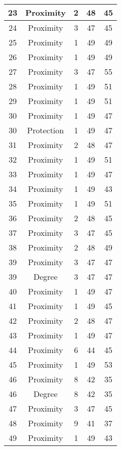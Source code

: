 \documentclass[results.tex]{subfiles}
\begin{document}
\begin{center}
\begin{tabular}{| c || c | c | c | c |}
    \hline
    23 & Proximity & 2 & 48 & 45 \\ 
    \hline
    24 & Proximity & 3 & 47 & 45 \\ 
    \hline
    25 & Proximity & 1 & 49 & 49 \\ 
    \hline
    26 & Proximity & 1 & 49 & 49 \\ 
    \hline
    27 & Proximity & 3 & 47 & 55 \\ 
    \hline
    28 & Proximity & 1 & 49 & 51 \\ 
    \hline
    29 & Proximity & 1 & 49 & 51 \\ 
    \hline
    30 & Proximity & 1 & 49 & 47 \\ 
    \hline
    30 & Protection & 1 & 49 & 47 \\ 
    \hline
    31 & Proximity & 2 & 48 & 47 \\ 
    \hline
    32 & Proximity & 1 & 49 & 51 \\ 
    \hline
    33 & Proximity & 1 & 49 & 47 \\ 
    \hline
    34 & Proximity & 1 & 49 & 43 \\ 
    \hline
    35 & Proximity & 1 & 49 & 51 \\ 
    \hline
    36 & Proximity & 2 & 48 & 45 \\ 
    \hline
    37 & Proximity & 3 & 47 & 45 \\ 
    \hline
    38 & Proximity & 2 & 48 & 49 \\ 
    \hline
    39 & Proximity & 3 & 47 & 47 \\ 
    \hline
    39 & Degree & 3 & 47 & 47 \\ 
    \hline
    40 & Proximity & 1 & 49 & 47 \\ 
    \hline
    41 & Proximity & 1 & 49 & 45 \\ 
    \hline
    42 & Proximity & 2 & 48 & 47 \\ 
    \hline
    43 & Proximity & 1 & 49 & 47 \\ 
    \hline
    44 & Proximity & 6 & 44 & 45 \\ 
    \hline
    45 & Proximity & 1 & 49 & 53 \\ 
    \hline
    46 & Proximity & 8 & 42 & 35 \\ 
    \hline
    46 & Degree & 8 & 42 & 35 \\ 
    \hline
    47 & Proximity & 3 & 47 & 45 \\ 
    \hline
    48 & Proximity & 9 & 41 & 37 \\ 
    \hline
    49 & Proximity & 1 & 49 & 43 \\ 
    \hline   \end{tabular}
\end{center}
\end{document}
